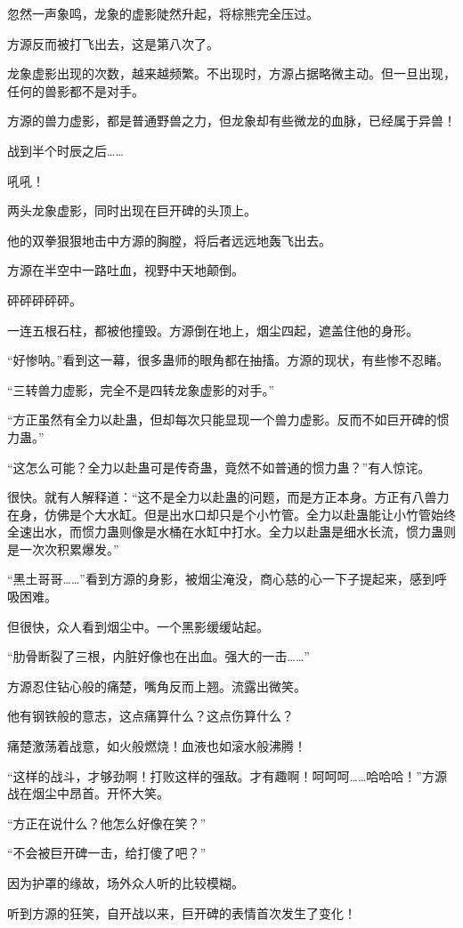 \begin{this_body}
忽然一声象鸣，龙象的虚影陡然升起，将棕熊完全压过。

方源反而被打飞出去，这是第八次了。

龙象虚影出现的次数，越来越频繁。不出现时，方源占据略微主动。但一旦出现，任何的兽影都不是对手。

方源的兽力虚影，都是普通野兽之力，但龙象却有些微龙的血脉，已经属于异兽！

战到半个时辰之后……

吼吼！

两头龙象虚影，同时出现在巨开碑的头顶上。

他的双拳狠狠地击中方源的胸膛，将后者远远地轰飞出去。

方源在半空中一路吐血，视野中天地颠倒。

砰砰砰砰砰。

一连五根石柱，都被他撞毁。方源倒在地上，烟尘四起，遮盖住他的身形。

“好惨呐。”看到这一幕，很多蛊师的眼角都在抽搐。方源的现状，有些惨不忍睹。

“三转兽力虚影，完全不是四转龙象虚影的对手。”

“方正虽然有全力以赴蛊，但却每次只能显现一个兽力虚影。反而不如巨开碑的惯力蛊。”

“这怎么可能？全力以赴蛊可是传奇蛊，竟然不如普通的惯力蛊？”有人惊诧。

很快。就有人解释道：“这不是全力以赴蛊的问题，而是方正本身。方正有八兽力在身，仿佛是个大水缸。但是出水口却只是个小竹管。全力以赴蛊能让小竹管始终全速出水，而惯力蛊则像是水桶在水缸中打水。全力以赴蛊是细水长流，惯力蛊则是一次次积累爆发。”

“黑土哥哥……”看到方源的身影，被烟尘淹没，商心慈的心一下子提起来，感到呼吸困难。

但很快，众人看到烟尘中。一个黑影缓缓站起。

“肋骨断裂了三根，内脏好像也在出血。强大的一击……”

方源忍住钻心般的痛楚，嘴角反而上翘。流露出微笑。

他有钢铁般的意志，这点痛算什么？这点伤算什么？

痛楚激荡着战意，如火般燃烧！血液也如滚水般沸腾！

“这样的战斗，才够劲啊！打败这样的强敌。才有趣啊！呵呵呵……哈哈哈！”方源战在烟尘中昂首。开怀大笑。

“方正在说什么？他怎么好像在笑？”

“不会被巨开碑一击，给打傻了吧？”

因为护罩的缘故，场外众人听的比较模糊。

听到方源的狂笑，自开战以来，巨开碑的表情首次发生了变化！


\end{this_body}
